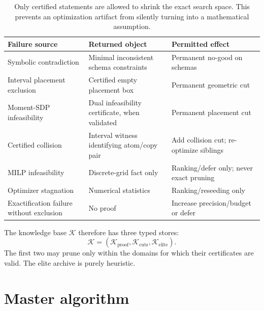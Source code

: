 \documentclass[11pt]{article}
\newcommand{\KB}{\mathcal K}
\begin{document}
\begin{table}[ht]
\centering
\small
\begin{tabular}{p{36mm}p{47mm}p{54mm}}
\toprule
Failure source & Returned object & Permitted effect \\
\midrule
Symbolic contradiction & Minimal inconsistent schema constraints & Permanent no-good on schemas \\
Interval placement exclusion & Certified empty placement box & Permanent geometric cut \\
Moment-SDP infeasibility & Dual infeasibility certificate, when validated & Permanent placement cut \\
Certified collision & Interval witness identifying atom/copy pair & Add collision cut; re-optimize siblings \\
MILP infeasibility & Discrete-grid fact only & Ranking/defer only; never exact pruning \\
Optimizer stagnation & Numerical statistics & Ranking/reseeding only \\
Exactification failure without exclusion & No proof & Increase precision/budget or defer \\
\bottomrule
\end{tabular}
\caption{Only certified statements are allowed to shrink the exact search space. This prevents an optimization artifact from silently turning into a mathematical assumption.}
\label{tab:feedback}
\end{table}

The knowledge base $\KB$ therefore has three typed stores:
\[
\KB=(\KB_{\mathrm{proof}},\KB_{\mathrm{cuts}},\KB_{\mathrm{elite}}).
\]
The first two may prune only within the domains for which their certificates are valid. The elite archive is purely heuristic.

\section{Master algorithm}
\end{document}
